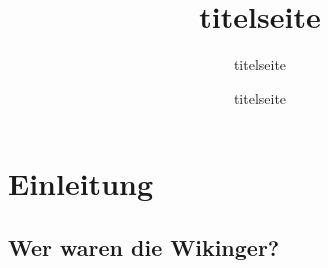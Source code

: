 \documentclass[12pt,a4paper,ngerman]{book}
\newcommand\blankpage{\null \thispagestyle{empty} \addtocounter{page}{-1} \newpage}
\newcommand{\fchapter}[1]{\chapter{#1}\thispagestyle{chapterstyle}}
\begin{document}
\author{titelseite}
\date{titelseite}
\title{titelseite}

\afterpage{\blankpage}
\maketitle
\thispagestyle{empty}
\tableofcontents
\thispagestyle{empty}
\newpage
\thispagestyle{empty}


\fchapter{Einleitung}

\section{Wer waren die Wikinger?}
\end{document}
